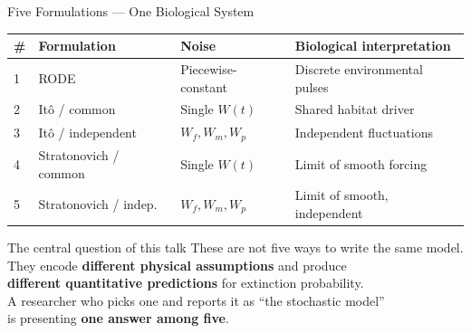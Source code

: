 \documentclass{beamer}
\begin{document}
\begin{frame}{Five Formulations — One Biological System}

    \footnotesize


  \begin{center}
  \renewcommand{\arraystretch}{1.1}
  \begin{tabular}{llll}
    \toprule
    \textbf{\#} & \textbf{Formulation} & \textbf{Noise} & \textbf{Biological interpretation} \\
    \midrule
    1 & RODE & Piecewise-constant & Discrete environmental pulses \\
    2 & It\^{o} / common & Single $W(t)$ & Shared habitat driver \\
    3 & It\^{o} / independent & $W_f, W_m, W_p$ & Independent fluctuations \\
    4 & Stratonovich / common & Single $W(t)$ & Limit of smooth forcing \\
    5 & Stratonovich / indep. & $W_f, W_m, W_p$ & Limit of smooth, independent \\
    \bottomrule
  \end{tabular}
  \end{center}

  \vspace{0.3cm}
  \begin{alertblock}{The central question of this talk}
    These are not five ways to write the same model.\\
    They encode \textbf{different physical assumptions} and produce\\
    \textbf{different quantitative predictions} for extinction probability.\\[4pt]
    A researcher who picks one and reports it as ``the stochastic model''\\
    is presenting \textbf{one answer among five}.
  \end{alertblock}

\end{frame}
\end{document}
